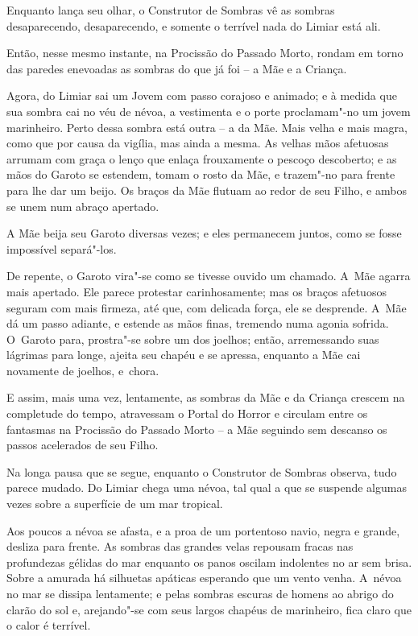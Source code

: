 Enquanto lança seu olhar, o Construtor de Sombras vê as
sombras desaparecendo, desaparecendo, e somente o terrível nada do
Limiar está ali.

Então, nesse mesmo instante, na Procissão do Passado Morto, rondam em
torno das paredes enevoadas as sombras do que já foi -- a Mãe e a
Criança.

\smallskip
Agora, do Limiar sai um Jovem com passo corajoso e animado; e à medida
que sua sombra cai no véu de névoa, a vestimenta e o porte
proclamam"-no um jovem marinheiro. Perto dessa sombra está outra -- a da
Mãe. Mais velha e mais magra, como que por causa da vigília, mas ainda a
mesma. As velhas mãos afetuosas arrumam com graça o lenço que enlaça
frouxamente o pescoço descoberto; e as mãos do Garoto se estendem, tomam o
rosto da Mãe, e trazem"-no para frente para lhe dar um beijo. Os braços
da Mãe flutuam ao redor de seu Filho, e ambos se unem num abraço
apertado.

A Mãe beija seu Garoto diversas vezes; e eles permanecem juntos, como se
fosse impossível separá"-los.

De repente, o Garoto vira"-se como se tivesse ouvido um chamado. A~Mãe
agarra mais apertado. Ele parece protestar carinhosamente; mas os braços
afetuosos seguram com mais firmeza, até que, com delicada força, ele se
desprende. A~Mãe dá um passo adiante, e estende as mãos finas, tremendo
numa agonia sofrida. O~Garoto para, prostra"-se sobre um dos
joelhos; então, arremessando suas lágrimas para longe, ajeita seu chapéu
e se apressa, enquanto a Mãe cai novamente de joelhos, e~chora.

E assim, mais uma vez, lentamente, as sombras da Mãe e da Criança
crescem na completude do tempo, atravessam o Portal do Horror e
circulam entre os fantasmas na Procissão do Passado Morto -- a Mãe
seguindo sem descanso os passos acelerados de seu Filho.

\smallskip
Na longa pausa que se segue, enquanto o Construtor de Sombras observa,
tudo parece mudado. Do Limiar chega uma névoa, tal qual a que se suspende
algumas vezes sobre a superfície de um mar tropical.

Aos poucos a névoa se afasta, e a proa de um portentoso navio, negra e
grande, desliza para frente. As sombras das grandes velas repousam
fracas nas profundezas gélidas do mar enquanto os panos oscilam
indolentes no ar sem brisa. Sobre a amurada há silhuetas apáticas
esperando que um vento venha. A~névoa no mar se dissipa lentamente; e
pelas sombras escuras de homens ao abrigo do clarão do sol e, arejando"-se
com seus largos chapéus de marinheiro, fica claro que o calor é terrível.

